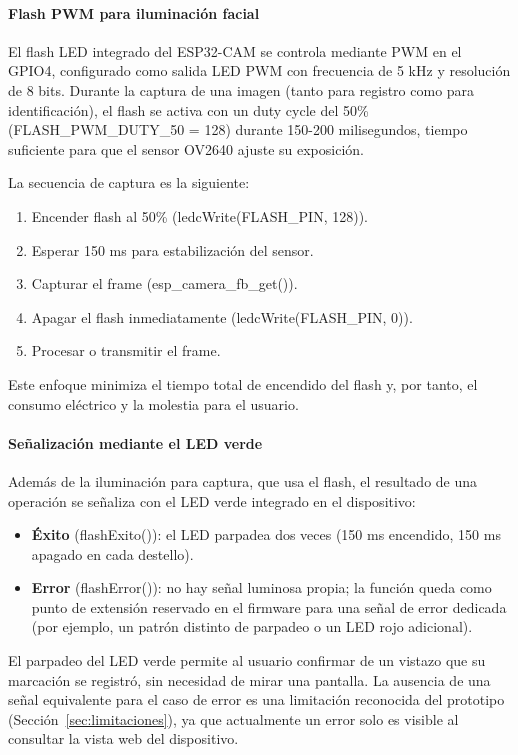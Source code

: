 \paragraph{Flash PWM para iluminación facial}

El flash LED integrado del ESP32-CAM se controla mediante PWM en el GPIO4, configurado como salida LED PWM con frecuencia de 5 kHz y resolución de 8 bits. Durante la captura de una imagen (tanto para registro como para identificación), el flash se activa con un duty cycle del 50\% (FLASH\_PWM\_DUTY\_50 = 128) durante 150-200 milisegundos, tiempo suficiente para que el sensor OV2640 ajuste su exposición.

La secuencia de captura es la siguiente:
\begin{enumerate}
    \item Encender flash al 50\% (ledcWrite(FLASH\_PIN, 128)).
    \item Esperar 150 ms para estabilización del sensor.
    \item Capturar el frame (esp\_camera\_fb\_get()).
    \item Apagar el flash inmediatamente (ledcWrite(FLASH\_PIN, 0)).
    \item Procesar o transmitir el frame.
\end{enumerate}

Este enfoque minimiza el tiempo total de encendido del flash y, por tanto, el consumo eléctrico y la molestia para el usuario.

\paragraph{Señalización mediante el LED verde}

Además de la iluminación para captura, que usa el flash, el resultado de una operación se señaliza con el LED verde integrado en el dispositivo:

\begin{itemize}
    \item \textbf{Éxito} (flashExito()): el LED parpadea dos veces (150 ms encendido, 150 ms apagado en cada destello).
    \item \textbf{Error} (flashError()): no hay señal luminosa propia; la función queda como punto de extensión reservado en el firmware para una señal de error dedicada (por ejemplo, un patrón distinto de parpadeo o un LED rojo adicional).
\end{itemize}

El parpadeo del LED verde permite al usuario confirmar de un vistazo que su marcación se registró, sin necesidad de mirar una pantalla. La ausencia de una señal equivalente para el caso de error es una limitación reconocida del prototipo (Sección~\ref{sec:limitaciones}), ya que actualmente un error solo es visible al consultar la vista web del dispositivo.

